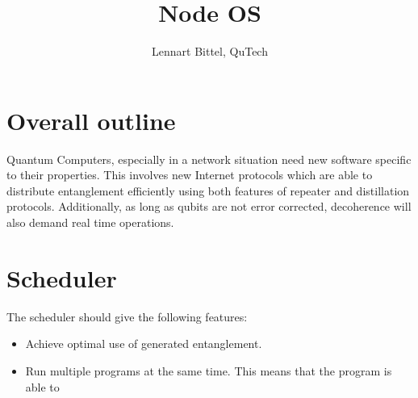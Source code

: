 \documentclass[]{article}
\title{Node OS}
\author{Lennart Bittel, QuTech}
\begin{document}
	
	\maketitle
\begin{figure}[h]
	\centering
{}
\end{figure}
\section{Overall outline}
Quantum Computers, especially in a network situation need new software specific to their properties. This involves new Internet protocols which are able to distribute entanglement efficiently using both features of repeater and distillation protocols.
Additionally, as long as qubits are not error corrected, decoherence will also demand real time operations.
\section{Scheduler}
The scheduler should give the following features:
\begin{itemize}
	\item Achieve optimal use of generated entanglement.
	\item Run multiple programs at the same time. This means that the program is able to 
\end{itemize}
\end{document}

